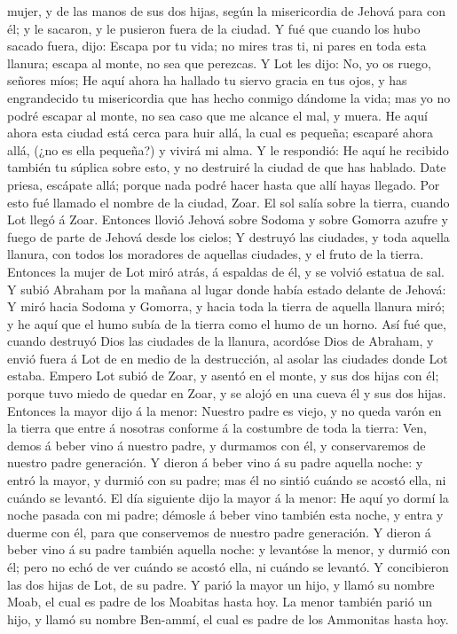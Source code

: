 mujer, y de las manos de sus dos hijas, según la misericordia de Jehová
para con él; y le sacaron, y le pusieron fuera de la ciudad.
 Y fué que cuando los hubo sacado fuera, dijo: Escapa por
tu vida; no mires tras ti, ni pares en toda esta llanura; escapa al
monte, no sea que perezcas.  Y Lot les dijo: No, yo os
ruego, señores míos;  He aquí ahora ha hallado tu siervo
gracia en tus ojos, y has engrandecido tu misericordia que has hecho
conmigo dándome la vida; mas yo no podré escapar al monte, no sea caso
que me alcance el mal, y muera.  He aquí ahora esta
ciudad está cerca para huir allá, la cual es pequeña; escaparé ahora
allá, (¿no es ella pequeña?) y vivirá mi alma.  Y le
respondió: He aquí he recibido también tu súplica sobre esto, y no
destruiré la ciudad de que has hablado.  Date priesa,
escápate allá; porque nada podré hacer hasta que allí hayas llegado. Por
esto fué llamado el nombre de la ciudad, Zoar.  El sol
salía sobre la tierra, cuando Lot llegó á Zoar.  Entonces
llovió Jehová sobre Sodoma y sobre Gomorra azufre y fuego de parte de
Jehová desde los cielos;  Y destruyó las ciudades, y toda
aquella llanura, con todos los moradores de aquellas ciudades, y el
fruto de la tierra.  Entonces la mujer de Lot miró atrás,
á espaldas de él, y se volvió estatua de sal.  Y subió
Abraham por la mañana al lugar donde había estado delante de Jehová:
 Y miró hacia Sodoma y Gomorra, y hacia toda la tierra de
aquella llanura miró; y he aquí que el humo subía de la tierra como el
humo de un horno.  Así fué que, cuando destruyó Dios las
ciudades de la llanura, acordóse Dios de Abraham, y envió fuera á Lot de
en medio de la destrucción, al asolar las ciudades donde Lot estaba.
 Empero Lot subió de Zoar, y asentó en el monte, y sus
dos hijas con él; porque tuvo miedo de quedar en Zoar, y se alojó en una
cueva él y sus dos hijas.  Entonces la mayor dijo á la
menor: Nuestro padre es viejo, y no queda varón en la tierra que entre á
nosotras conforme á la costumbre de toda la tierra:  Ven,
demos á beber vino á nuestro padre, y durmamos con él, y conservaremos
de nuestro padre generación.  Y dieron á beber vino á su
padre aquella noche: y entró la mayor, y durmió con su padre; mas él no
sintió cuándo se acostó ella, ni cuándo se levantó.  El
día siguiente dijo la mayor á la menor: He aquí yo dormí la noche pasada
con mi padre; démosle á beber vino también esta noche, y entra y duerme
con él, para que conservemos de nuestro padre generación.
 Y dieron á beber vino á su padre también aquella noche:
y levantóse la menor, y durmió con él; pero no echó de ver cuándo se
acostó ella, ni cuándo se levantó.  Y concibieron las dos
hijas de Lot, de su padre.  Y parió la mayor un hijo, y
llamó su nombre Moab, el cual es padre de los Moabitas hasta hoy.
 La menor también parió un hijo, y llamó su nombre
Ben-ammí, el cual es padre de los Ammonitas hasta hoy.


